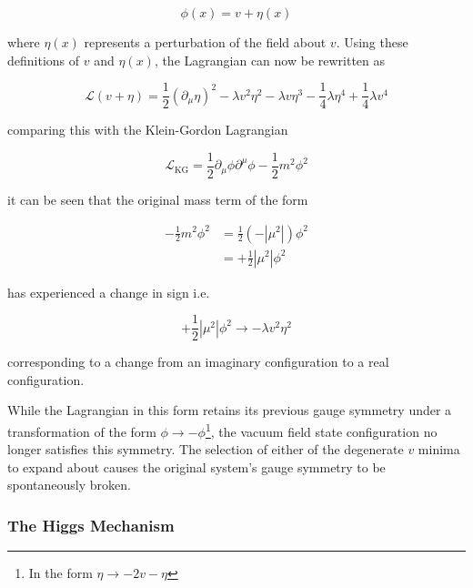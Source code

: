 \documentclass[12pt,a4paper,epsf,portrait,times,epsfig]{report}
\begin{document}
	\begin{equation}
		\phi(x) = v + \eta(x)
	\end{equation}

	where $\eta(x)$ represents a perturbation of the field about $v$. Using these definitions of $v$ and $\eta(x)$, the Lagrangian can now be rewritten as

	\begin{equation}
		\mathcal{L}(v + \eta) = \frac{1}{2}(\partial_{\mu}\eta)^{2}-\lambda v^{2}\eta^{2}-\lambda v\eta^{3}-\frac{1}{4}\lambda\eta^{4}+\frac{1}{4}\lambda v^{4}
	\end{equation}

	comparing this with the Klein-Gordon Lagrangian

	\begin{equation}
		\mathcal{L}_{\mathrm{KG}} = \frac{1}{2}\partial_{\mu}\phi\partial^{\mu}\phi-\frac{1}{2}m^{2}\phi^{2}
	\end{equation}

	it can be seen that the original mass term of the form

	\begin{equation}
		\begin{split}
		-\frac{1}{2}m^{2}\phi^{2} &= \frac{1}{2}(-|\mu^{2}|)\phi^{2} \\
		&= +\frac{1}{2}|\mu^{2}|\phi^{2}
		\end{split}
	\end{equation}

	has experienced a change in sign i.e.

	\begin{equation}
		+\frac{1}{2}|\mu^{2}|\phi^{2} \rightarrow -\lambda v^{2}\eta^{2}
	\end{equation}

	corresponding to a change from an imaginary configuration to a real configuration. 

	While the Lagrangian in this form retains its previous gauge symmetry under a transformation of the form $\phi \rightarrow -\phi$\footnote{In the form $\eta \rightarrow -2v-\eta$}, the vacuum field state configuration no longer satisfies this symmetry. The selection of either of the degenerate $v$ minima to expand about causes the original system's gauge symmetry to be spontaneously broken. 

	\subsubsection{The Higgs Mechanism}
\end{document}
